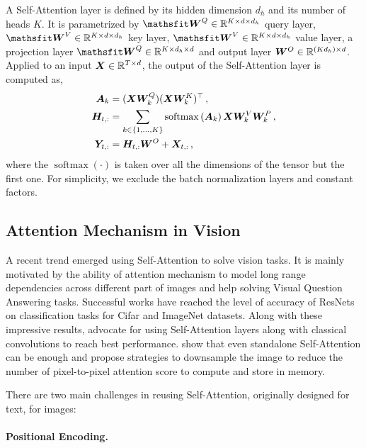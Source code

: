 \documentclass{article} %
\begin{document}
A Self-Attention layer is defined by its hidden dimension $d_{h}$ and its number of heads $K$.  %
It is parametrized by
$\tW^Q \in \R^{K \times d \times d_{h}}$ query layer, $\tW^V \in \R^{K \times d \times d_{h}}$ key layer, $\tW^V \in \R^{K \times d \times d_{h}}$ value layer, a projection layer $\tW^Q \in \R^{K \times d_{h} \times d}$ and output layer ${\bm{W}}^O \in \mathbb{R}^{(Kd_{h})\times d}$. 
%
Applied to an input ${\bm{X}} \in \mathbb{R}^{T\times d}$, the output of the Self-Attention layer is computed as,
%
\begin{align}
  {\bm{A}}_k &= 
    ({\bm{X}} {\bm{W}}_k^Q)({\bm{X}} {\bm{W}}_k^K)^\top
  \,, \label{eq:att_coeff}\\
  {\bm{H}}_{t,:} &= 
  \sum_{k \in \{1,\dots, K\}} 
  \operatorname{softmax}
  \left(
    {\bm{A}}_k
  \right)
  {\bm{X}}
  {\bm{W}}_k^V
  {\bm{W}}_k^P
  \,,\\
  {\bm{Y}}_{t,:} &= {\bm{H}}_{t,:} {\bm{W}}^O + {\bm{X}}_{t,:}\,,
  \label{eq:attention}
\end{align}
where the $\operatorname{softmax}(\cdot)$ is taken over all the dimensions of the tensor but the first one. For simplicity, we exclude the batch normalization layers and constant factors.%
%


\subsection{Attention Mechanism in Vision}

A recent trend emerged using Self-Attention to solve vision tasks.
%
It is mainly motivated by the ability of attention mechanism to model long range dependencies across different part of images and help solving Visual Question Answering tasks. 
% 
Successful works have reached the level of accuracy of ResNets on classification tasks for Cifar and ImageNet datasets. 
%
Along with these impressive results, \cite{belloAttentionAugmentedConvolutional2019} advocate for using Self-Attention layers along with classical convolutions to reach best performance.
%
\cite{ramachandran2019standaloneselfattention} show that even standalone Self-Attention can be enough and propose strategies to downsample the image to reduce the number of pixel-to-pixel attention score to compute and store in memory.


There are two main challenges in reusing Self-Attention, originally designed for text, for images:
\paragraph{Positional Encoding.}
%
\end{document}
